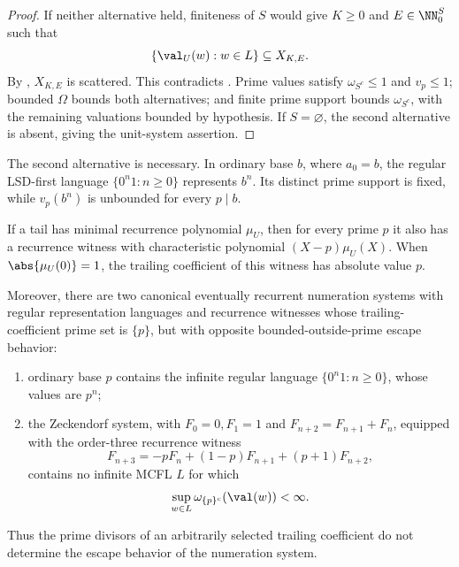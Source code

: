 \begin{proof}
  If neither alternative held, finiteness of \(S\) would give
  \(K\ge0\) and \(E\in\NN_0^S\) such that
  \[
    \{\val_U(w):w\in L\}\subseteq X_{K,E}.
  \]
  By , \(X_{K,E}\) is scattered.
  This contradicts
  . Prime values satisfy
  \(\omega_{S^c}\le1\) and \(v_p\le1\); bounded \(\Omega\) bounds both
  alternatives; and finite prime support bounds \(\omega_{S^c}\), with
  the remaining valuations bounded by hypothesis. If \(S=\varnothing\),
  the second alternative is absent, giving the unit-system assertion.
\end{proof}

The second alternative is necessary. In ordinary base \(b\), where
\(a_0=b\), the regular LSD-first language
\(\{0^n1:n\ge0\}\) represents \(b^n\). Its distinct prime support is
fixed, while \(v_p(b^n)\) is unbounded for every \(p\mid b\).

\begin{proposition}
  \label{prop:recurrence-witness-separation}
  If a tail has minimal recurrence polynomial \(\mu_U\), then for every
  prime \(p\) it also has a recurrence witness with characteristic
  polynomial \((X-p)\mu_U(X)\).  When \(\abs{\mu_U(0)}=1\), the trailing
  coefficient of this witness has absolute value \(p\).

  Moreover, there are two canonical eventually recurrent
  numeration systems with regular representation languages and recurrence
  witnesses whose trailing-coefficient prime set is \(\{p\}\), but with
  opposite bounded-outside-prime escape behavior:
  \begin{enumerate}[label=\textup{(\roman*)}]
    \item ordinary base \(p\) contains the infinite regular language
    \(\{0^n1:n\ge0\}\), whose values are \(p^n\);
    \item the Zeckendorf system, with \(F_0=0,F_1=1\) and
    \(F_{n+2}=F_{n+1}+F_n\), equipped with the order-three recurrence
    witness
    \[
      F_{n+3}=-pF_n+(1-p)F_{n+1}+(p+1)F_{n+2},
    \]
    contains no infinite MCFL \(L\) for which
    \[
      \sup_{w\in L}\omega_{\{p\}^c}(\val(w))<\infty.
    \]
  \end{enumerate}
  Thus the prime divisors of an arbitrarily selected trailing coefficient
  do not determine the escape behavior of the numeration system.
\end{proposition}

